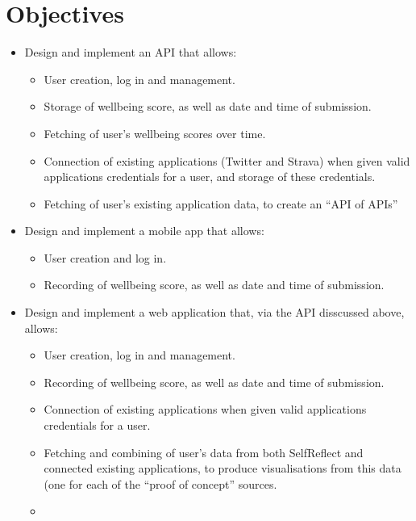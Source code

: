 \documentclass[11pt,openright,a4paper]{report}
\begin{document}
\section{Objectives}
\begin{itemize}

\item Design and implement an API that allows:
\begin{itemize}
  \item User creation, log in and management.
  \item Storage of wellbeing score, as well as date and time of submission.
  \item Fetching of user's wellbeing scores over time.
  \item Connection of existing applications (Twitter and Strava) when given valid applications credentials for a user, and storage of these credentials.
  \item Fetching of user's existing application data, to create an \enquote{API of APIs}
\end{itemize} 
  
\item Design and implement a mobile app that allows:
\begin{itemize}
  \item User creation and log in.
  \item Recording of wellbeing score, as well as date and time of submission.
\end{itemize}

\item Design and implement a web application that, via the API disscussed above, allows:
\begin{itemize}
  \item User creation, log in and management.
  \item Recording of wellbeing score, as well as date and time of submission.
  \item Connection of existing applications when given valid applications credentials for a user.
  \item Fetching and combining of user's data from both SelfReflect and connected existing applications, to produce visualisations from this data (one for each of the \enquote{proof of concept} sources.
  \item 
\end{itemize} 


\end{itemize}
\end{document}

